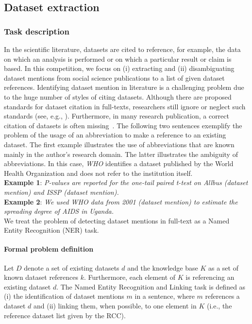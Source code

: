 \subsection{Dataset extraction}
\label{sec:dataset-extraction}
\subsubsection{Task description}
In the scientific literature, datasets are cited to reference, for example, the data on which an analysis is performed or on which a particular result or claim is based.
In this competition, we focus on (i) extracting and (ii) disambiguating dataset mentions from social science publications to a list of given dataset references.
Identifying dataset mention in literature is a challenging problem due to the huge number of styles of citing datasets. Although there are proposed standards for dataset citation in full-texts, researchers still ignore or neglect such standards (see, e.g., \cite{altman2007proposed}).
Furthermore, in many research publication, a correct citation of datasets is often missing~\cite{boland2012identifying}. 
The following two sentences exemplify the problem of the usage of an abbreviation to make a reference to an existing dataset.
The first example illustrates the use of abbreviations that are known mainly in the author's research domain.
The latter illustrates the ambiguity of abbreviations.
In this case, \emph{WHO} identifies a dataset published by the World Health Organization and does not refer to the institution itself.\\
\textbf{Example 1}: \emph{P-values are reported for the one-tail paired t-test on \emph{Allbus} (dataset mention) and \emph{ISSP} (dataset mention).}\\
\textbf{Example 2}: \emph{We used \emph{WHO data from 2001} (dataset mention) to estimate the spreading degree of AIDS in Uganda.}\\
We treat the problem of detecting dataset mentions in full-text as a Named Entity Recognition (NER) task. 
\paragraph{Formal problem definition}%
Let $D$ denote a set of existing datasets $d$ and the knowledge base $K$ as a set of known dataset references $k$. Furthermore, each element of $K$ is referencing an existing dataset $d$. The Named Entity Recognition and Linking task is defined as (i) the identification of dataset mentions $m$ in a sentence, where $m$ references a dataset $d$ and (ii) linking them, when possible, to one element in $K$ (i.e., the reference dataset list given by the RCC). 


